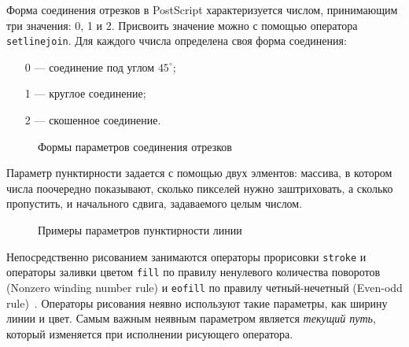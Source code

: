 Форма соединения отрезков в PostScript характеризуется числом, принимающим три значения: 0, 1 и 2. Присвоить значение можно с помощью оператора \texttt{setlinejoin}. Для каждого ччисла определена своя форма соединения:
\begin{itemize}
\item [0 ---] соединение под углом $45^{\circ} $;
\item [1 ---] круглое соединение;
\item [2 ---] скошенное соединение.
\end{itemize} 

\begin{figure}[t]
\caption{Формы параметров соединения отрезков}\label{pic_linejoin}
\end{figure}

Параметр пунктирности задается с помощью двух элментов: массива, в котором числа поочередно показывают, сколько пикселей нужно заштриховать, а сколько пропустить, и начального сдвига, задаваемого целым числом.

\begin{figure}[t]
\caption{Примеры параметров пунктирности линии}\label{pic_dash}
\end{figure}

 
Непосредственно рисованием занимаются операторы прорисовки \texttt{stroke} и операторы заливки цветом \texttt{fill} по правилу ненулевого количества поворотов (Nonzero winding number rule) и \texttt{eofill} по правилу четный-нечетный (Even-odd rule)~\cite{plrm2}. Операторы рисования неявно используют такие параметры, как ширину линии и цвет. Самым важным неявным параметром является \textit{текущий путь}, который изменяется при исполнении рисующего оператора. 

